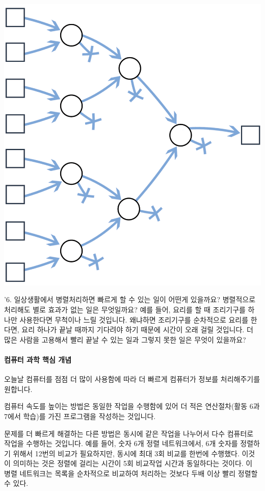 \documentclass[]{article}
\begin{document}
\includegraphics{csunplugged/02-part/img/ch08-parallel/08-parallel-05-minimum-networks.png}

'6. 일상생활에서 병렬처리하면 빠르게 할 수 있는 일이 어떤게 있을까요?
병렬적으로 처리해도 별로 효과가 없는 일은 무엇일까요? 예를 들어, 요리를
할 때 조리기구를 하나만 사용한다면 무척이나 느릴 것입니다. 왜냐하면
조리기구를 순차적으로 요리를 한다면, 요리 하나가 끝날 때까지 기다려야
하기 때문에 시간이 오래 걸릴 것입니다. 더 많은 사람을 고용해서 빨리 끝날
수 있는 일과 그렇지 못한 일은 무엇이 있을까요?

\mbox{}\paragraph{컴퓨터 과학 핵심 개념}\label{section-121}

오늘날 컴퓨터를 점점 더 많이 사용함에 따라 더 빠르게 컴퓨터가 정보를
처리해주기를 원합니다.

컴퓨터 속도를 높이는 방법은 동일한 작업을 수행함에 있어 더 적은
연산절차(활동 6과 7에서 학습)를 가진 프로그램을 작성하는 것입니다.

문제를 더 빠르게 해결하는 다른 방법은 동시에 같은 작업을 나누어서 다수
컴퓨터로 작업을 수행하는 것입니다. 예를 들어, 숫자 6개 정렬
네트워크에서, 6개 숫자를 정렬하기 위해서 12번의 비교가 필요하지만,
동시에 최대 3회 비교를 한번에 수행했다. 이것이 의미하는 것은 정렬에
걸리는 시간이 5회 비교작업 시간과 동일하다는 것이다. 이 병렬 네트워크는
목록을 순차적으로 비교하여 처리하는 것보다 두배 이상 빨리 정렬할 수
있다.
\end{document}
